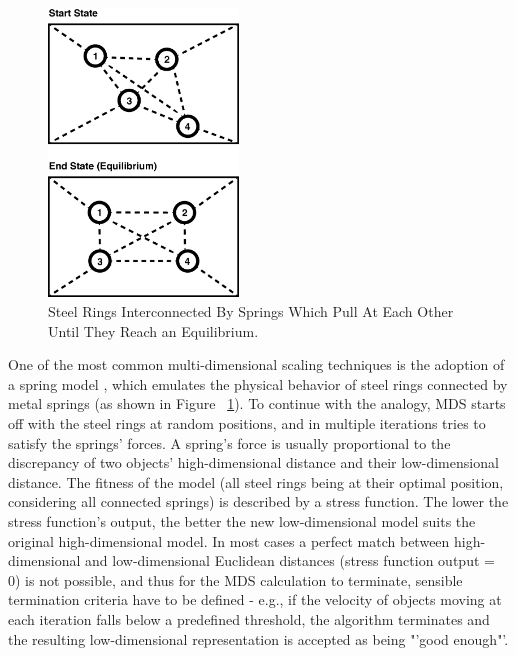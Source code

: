 \begin{figure}[H]
  \centering
    \includegraphics[width=0.45\textwidth]{figures/spring_model}
  \caption{Steel Rings Interconnected By Springs Which Pull At Each Other Until They Reach an Equilibrium.}
  \label{fig:spring_model}
\end{figure}

One of the most common multi-dimensional scaling techniques is the adoption of a spring model \cite{Morrison:2003:FMS}, which emulates the physical behavior of steel rings connected by metal springs (as shown in Figure ~\ref{fig:spring_model}). To continue with the analogy, MDS starts off with the steel rings at random positions, and in multiple iterations tries to satisfy the springs' forces. A spring's force is usually proportional to the discrepancy of two objects' high-dimensional distance and their low-dimensional distance. The fitness of the model (all steel rings being at their optimal position, considering all connected springs) is described by a stress function. The lower the stress function's output, the better the new low-dimensional model suits the original high-dimensional model. In most cases a perfect match between high-dimensional and low-dimensional Euclidean distances (stress function output = 0) is not possible, and thus for the MDS calculation to terminate, sensible termination criteria have to be defined - e.g., if the velocity of objects moving at each iteration falls below a predefined threshold, the algorithm terminates and the resulting low-dimensional representation is accepted as being "'good enough"'.

